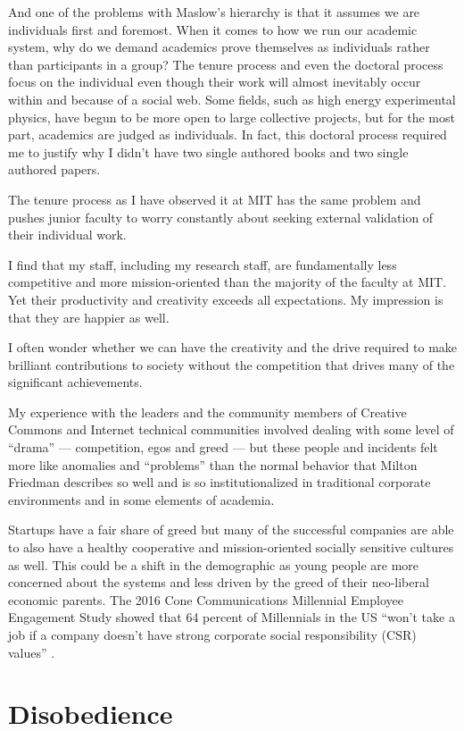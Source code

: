 And one of the problems with Maslow's hierarchy is that it assumes we are individuals first and foremost. When it comes to how we run our academic system, why do we demand academics prove themselves as individuals rather than participants in a group? The tenure process and even the doctoral process focus on the individual even though their work will almost inevitably occur within and because of a social web. Some fields, such as high energy experimental physics, have begun to be more open to large collective projects, but for the most part, academics are judged as individuals. In fact, this doctoral process required me to justify why I didn't have two single authored books and two single authored papers.

The tenure process as I have observed it at MIT has the same problem and pushes junior faculty to worry constantly about seeking external validation of their individual work.

I find that my staff, including my research staff, are fundamentally less competitive and more mission-oriented than the majority of the faculty at MIT. Yet their productivity and creativity exceeds all expectations. My impression is that they are happier as well.

I often wonder whether we can have the creativity and the drive required to make brilliant contributions to society without the competition that drives many of the significant achievements.

My experience with the leaders and the community members of Creative Commons and  Internet technical communities involved dealing with some level of ``drama'' --- competition, egos and greed --- but these people and incidents felt more like anomalies and ``problems'' than the normal behavior that Milton Friedman describes so well and is so institutionalized in traditional corporate environments and in some elements of academia.

Startups have a fair share of greed but many of the successful companies are able to also have a healthy cooperative and mission-oriented socially sensitive cultures as well. This could be a shift in the demographic as young people are more concerned about the systems and less driven by the greed of their neo-liberal economic parents. The 2016 Cone Communications Millennial Employee Engagement Study showed that 64 percent of Millennials in the US ``won’t take a job if a company doesn’t have strong corporate social responsibility (CSR) values'' \cite{conestudy}.

\section{Disobedience}

